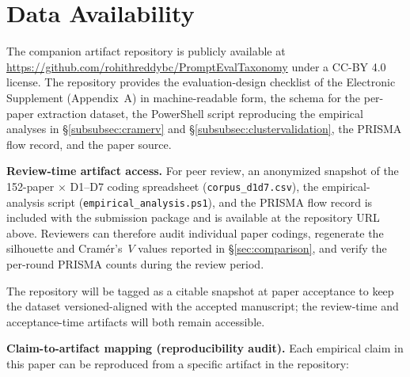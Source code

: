 \documentclass[acmsmall, nonacm, screen]{acmart}
\begin{document}
\section*{Data Availability}
\label{sec:data}
\begin{sloppypar}
The companion artifact repository is publicly available at
\url{https://github.com/rohithreddybc/PromptEvalTaxonomy} under a
CC-BY 4.0 license. The repository provides the evaluation-design
checklist of the Electronic Supplement (Appendix~A) in
machine-readable form, the schema for the per-paper extraction
dataset, the PowerShell script reproducing the empirical analyses in
\S\ref{subsubsec:cramerv} and \S\ref{subsubsec:clustervalidation}, the
PRISMA flow record, and the paper source.

\textbf{Review-time artifact access.} For peer review, an anonymized
snapshot of the 152-paper $\times$ D1--D7 coding spreadsheet
(\texttt{corpus\_d1d7.csv}), the empirical-analysis script
(\texttt{empirical\_analysis.ps1}), and the PRISMA flow record is
included with the submission package and is available at the
repository URL above. Reviewers can therefore audit individual paper
codings, regenerate the silhouette and Cram\'{e}r's~$V$ values reported
in \S\ref{sec:comparison}, and verify the per-round PRISMA counts
during the review period.
\end{sloppypar}

The repository will be tagged as a citable snapshot at paper
acceptance to keep the dataset versioned-aligned with the accepted
manuscript; the review-time and acceptance-time artifacts will both
remain accessible.

\textbf{Claim-to-artifact mapping (reproducibility audit).} Each
empirical claim in this paper can be reproduced from a specific
artifact in the repository:
\end{document}

